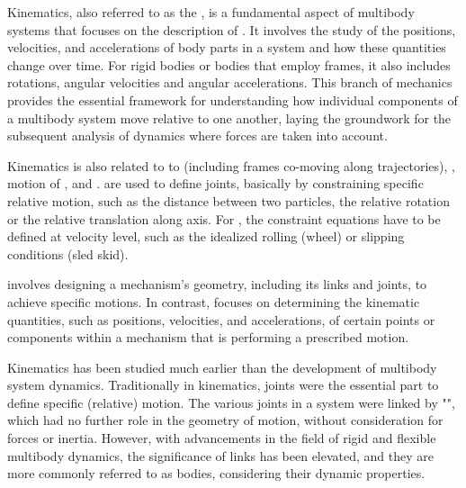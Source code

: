 Kinematics, also referred to as the , is a fundamental aspect of multibody systems that focuses on the description of . It involves the study of the positions, velocities, and accelerations of body parts in a system and how these quantities change over time. For rigid bodies or bodies that employ frames, it also includes rotations, angular velocities and angular accelerations. This branch of mechanics provides the essential framework for understanding how individual components of a multibody system move relative to one another, laying the groundwork for the subsequent analysis of dynamics where forces are taken into account.

Kinematics is also related to to  (including frames co-moving along trajectories), , motion of , and .  are used to define joints, basically by constraining specific relative motion, such as the distance between two particles, the relative rotation or the relative translation along axis. For , the constraint equations have to be defined at velocity level, such as the idealized rolling (wheel) or slipping conditions (sled skid).

 involves designing a mechanism's geometry, including its links and joints, to achieve specific motions. In contrast,  focuses on determining the kinematic quantities, such as positions, velocities, and accelerations, of certain points or components within a mechanism that is performing a prescribed motion.

%
Kinematics has been studied much earlier than the development of multibody system dynamics. Traditionally in kinematics, joints were the essential part to define specific (relative) motion. The various joints in a system were linked by "", which had no further role in the geometry of motion, without consideration for forces or inertia.
However, with advancements in the field of rigid and flexible multibody dynamics, the significance of links has been elevated, and they are more commonly referred to as bodies, considering their dynamic properties.

